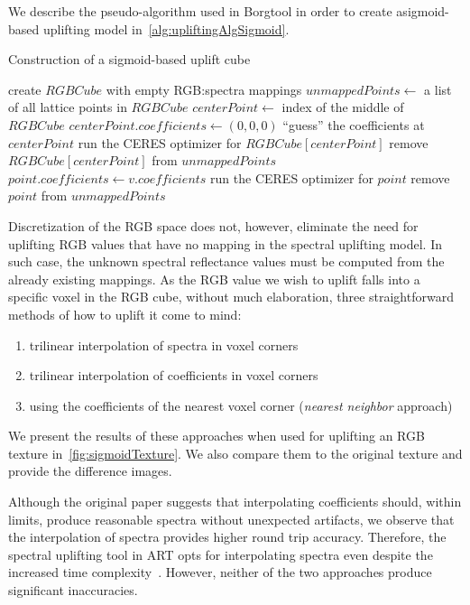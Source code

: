 We describe the pseudo-algorithm used in Borgtool in order to create a\newline sigmoid-based uplifting model in~\cref{alg:upliftingAlgSigmoid}.

\begin{algorithm}[t!]
	\caption{Construction of a sigmoid-based uplift cube}
	\label{alg:upliftingAlgSigmoid}
	\begin{algorithmic}[1]
		\State create $RGBCube$ with empty RGB:spectra mappings
		\State $unmappedPoints \gets$ a list of all lattice points in $RGBCube$
		\State $centerPoint \gets$ index of the middle of $RGBCube$
		\Statex {}
		\State $centerPoint.coefficients \gets (0,0,0)$
		\Statex \Comment ``guess'' the coefficients at $centerPoint$
		\State run the CERES optimizer for $RGBCube[centerPoint]$
		\State remove $RGBCube[centerPoint]$ from $unmappedPoints$
		\State $point.coefficients \gets v.coefficients$
		\State run the CERES optimizer for $point$
		\State remove $point$ from $unmappedPoints$
		\EndIf
		\EndIf
		\EndFor
		\EndWhile
	\end{algorithmic}
\end{algorithm}

Discretization of the RGB space does not, however, eliminate the need for uplifting RGB values that have no mapping in the spectral uplifting model. In such case, the unknown spectral reflectance values must be computed from the already existing mappings. As the RGB value we wish to uplift falls into a specific voxel in the RGB cube, without much elaboration, three straightforward methods of how to uplift it come to mind:
\begin{enumerate}
	\item trilinear interpolation of spectra in voxel corners
	\item trilinear interpolation of coefficients in voxel corners
	\item using the coefficients of the nearest voxel corner (\emph{nearest neighbor} approach)
\end{enumerate}

We present the results of these approaches when used for uplifting an RGB texture in~\cref{fig:sigmoidTexture}. We also compare them to the original texture and provide the difference images.

Although the original paper suggests that interpolating coefficients should, within limits, produce reasonable spectra without unexpected artifacts, we observe that the interpolation of spectra provides higher round trip accuracy. Therefore, the spectral uplifting tool in ART opts for interpolating spectra even despite the increased time complexity~\cite{ARTsigmoids}. However, neither of the two approaches produce significant inaccuracies.

